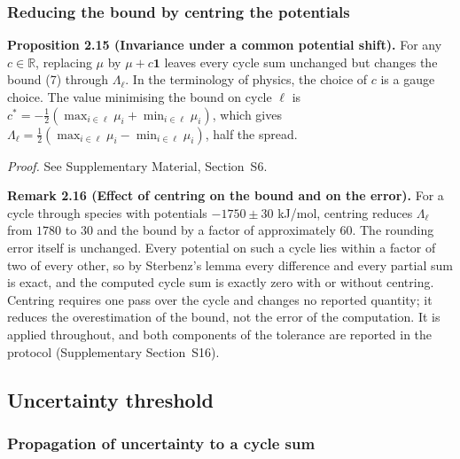 \documentclass[11pt,a4paper]{article}
\theoremstyle{pstyle}
\theoremstyle{definition}
\theoremstyle{remark}
\newcommand{\R}{\mathbb{R}}
\begin{document}
\subsubsection{Reducing the bound by centring the potentials}
\label{sec:gauge}

\par\noindent\textbf{Proposition 2.15 (Invariance under a common potential shift).}\label{prop:gauge} 
For any $c\in\R$, replacing $\mu$ by $\mu + c\mathbf{1}$ leaves every
cycle sum unchanged but changes the bound (7)
through $\Lambda_\ell$. In the terminology of physics, the choice of
$c$ is a gauge choice. The value minimising the bound on cycle $\ell$ is
$c^{\ast} = -\tfrac{1}{2}(\max_{i\in\ell}\mu_i + \min_{i\in\ell}\mu_i)$,
which gives $\Lambda_\ell = \tfrac{1}{2}(\max_{i\in\ell}\mu_i -
\min_{i\in\ell}\mu_i)$, half the spread.
\par

\noindent\emph{Proof.} See Supplementary Material, Section~S6.

\par\noindent\textbf{Remark 2.16 (Effect of centring on the bound and on the error).}\label{rem:gauge-gain} 
For a cycle through species with potentials $-1750\pm 30$ kJ/mol,
centring reduces $\Lambda_\ell$ from $1780$ to $30$ and the bound by a
factor of approximately $60$. The rounding error itself is unchanged.
Every potential on such a cycle lies within a factor of two of every
other, so by Sterbenz's lemma every difference and every partial sum is
exact, and the computed cycle sum is exactly zero with or without
centring. Centring requires one pass over the cycle and changes no
reported quantity; it reduces the overestimation of the bound, not the
error of the computation. It is applied throughout, and both components
of the tolerance are reported in the protocol (Supplementary
Section~S16).
\par

\subsection{Uncertainty threshold}
\label{sec:data-floor}

\subsubsection{Propagation of uncertainty to a cycle sum}
\end{document}
